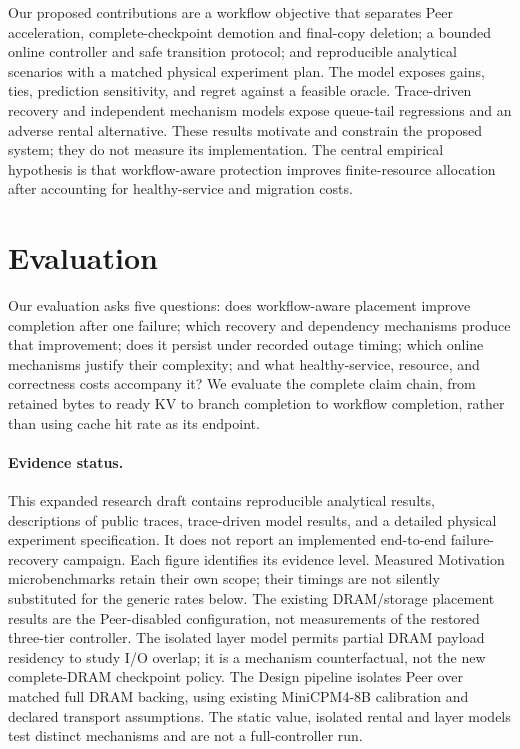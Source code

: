 \documentclass[sigplan,10pt,anonymous,nonacm]{acmart}
\begin{document}
Our proposed contributions are a workflow objective that separates Peer
acceleration, complete-checkpoint demotion and final-copy deletion; a bounded online controller and safe transition
protocol; and reproducible analytical scenarios with a matched physical
experiment plan. The model exposes gains, ties, prediction sensitivity,
and regret against a feasible oracle. Trace-driven recovery and independent
mechanism models expose queue-tail regressions and an adverse rental
alternative. These results
motivate and constrain the proposed
system; they do not measure its implementation. The central empirical
hypothesis is that workflow-aware protection improves finite-resource
allocation after accounting for healthy-service and migration costs.




\section{Evaluation}
\label{sec:evaluation}

Our evaluation asks five questions: does workflow-aware placement improve
completion after one failure; which recovery and dependency mechanisms
produce that improvement; does it persist under recorded outage timing;
which online mechanisms justify their complexity; and what healthy-service,
resource, and correctness costs accompany it? We evaluate the complete
claim chain, from retained bytes to ready KV to branch completion to
workflow completion, rather than using cache hit rate as its endpoint.

\paragraph{Evidence status.}
This expanded research draft contains reproducible analytical results,
descriptions of public traces, trace-driven model results, and a detailed
physical experiment specification. It does not report an implemented
end-to-end failure-recovery campaign. Each figure identifies its evidence
level. Measured Motivation microbenchmarks retain their own scope;
their timings are not silently substituted for the generic rates below.
The existing DRAM/storage placement results are the Peer-disabled
configuration, not measurements of the restored three-tier controller.
The isolated layer model permits partial DRAM payload residency to study
I/O overlap; it is a mechanism counterfactual, not the new complete-DRAM
checkpoint policy. The Design pipeline isolates Peer over matched full DRAM backing,
using existing MiniCPM4-8B calibration and declared transport assumptions. The static value, isolated rental and
layer models test distinct mechanisms and are not a full-controller run.
\end{document}
